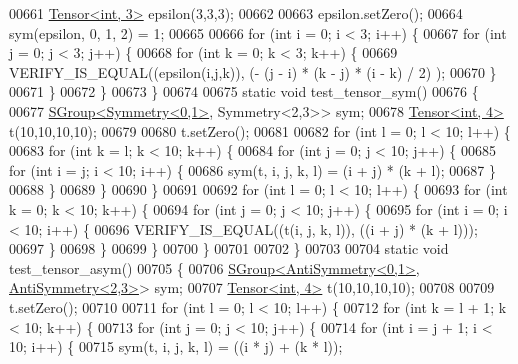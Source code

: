 \begin{DoxyCode}
00661   \hyperlink{class_eigen_1_1_tensor}{Tensor<int, 3>} epsilon(3,3,3);
00662 
00663   epsilon.setZero();
00664   sym(epsilon, 0, 1, 2) = 1;
00665 
00666   \textcolor{keywordflow}{for} (\textcolor{keywordtype}{int} i = 0; i < 3; i++) \{
00667     \textcolor{keywordflow}{for} (\textcolor{keywordtype}{int} j = 0; j < 3; j++) \{
00668       \textcolor{keywordflow}{for} (\textcolor{keywordtype}{int} k = 0; k < 3; k++) \{
00669         VERIFY\_IS\_EQUAL((epsilon(i,j,k)), (- (j - i) * (k - j) * (i - k) / 2) );
00670       \}
00671     \}
00672   \}
00673 \}
00674 
00675 \textcolor{keyword}{static} \textcolor{keywordtype}{void} test\_tensor\_sym()
00676 \{
00677   \hyperlink{class_eigen_1_1_s_group}{SGroup<Symmetry<0,1>}, Symmetry<2,3>> sym;
00678   \hyperlink{class_eigen_1_1_tensor}{Tensor<int, 4>} t(10,10,10,10);
00679 
00680   t.setZero();
00681 
00682   \textcolor{keywordflow}{for} (\textcolor{keywordtype}{int} l = 0; l < 10; l++) \{
00683     \textcolor{keywordflow}{for} (\textcolor{keywordtype}{int} k = l; k < 10; k++) \{
00684       \textcolor{keywordflow}{for} (\textcolor{keywordtype}{int} j = 0; j < 10; j++) \{
00685         \textcolor{keywordflow}{for} (\textcolor{keywordtype}{int} i = j; i < 10; i++) \{
00686           sym(t, i, j, k, l) = (i + j) * (k + l);
00687         \}
00688       \}
00689     \}
00690   \}
00691 
00692   \textcolor{keywordflow}{for} (\textcolor{keywordtype}{int} l = 0; l < 10; l++) \{
00693     \textcolor{keywordflow}{for} (\textcolor{keywordtype}{int} k = 0; k < 10; k++) \{
00694       \textcolor{keywordflow}{for} (\textcolor{keywordtype}{int} j = 0; j < 10; j++) \{
00695         \textcolor{keywordflow}{for} (\textcolor{keywordtype}{int} i = 0; i < 10; i++) \{
00696           VERIFY\_IS\_EQUAL((t(i, j, k, l)), ((i + j) * (k + l)));
00697         \}
00698       \}
00699     \}
00700   \}
00701 
00702 \}
00703 
00704 \textcolor{keyword}{static} \textcolor{keywordtype}{void} test\_tensor\_asym()
00705 \{
00706   \hyperlink{class_eigen_1_1_s_group}{SGroup<AntiSymmetry<0,1>}, \hyperlink{struct_eigen_1_1_anti_symmetry}{AntiSymmetry<2,3>}> sym;
00707   \hyperlink{class_eigen_1_1_tensor}{Tensor<int, 4>} t(10,10,10,10);
00708 
00709   t.setZero();
00710 
00711   \textcolor{keywordflow}{for} (\textcolor{keywordtype}{int} l = 0; l < 10; l++) \{
00712     \textcolor{keywordflow}{for} (\textcolor{keywordtype}{int} k = l + 1; k < 10; k++) \{
00713       \textcolor{keywordflow}{for} (\textcolor{keywordtype}{int} j = 0; j < 10; j++) \{
00714         \textcolor{keywordflow}{for} (\textcolor{keywordtype}{int} i = j + 1; i < 10; i++) \{
00715           sym(t, i, j, k, l) = ((i * j) + (k * l));

\end{DoxyCode}
